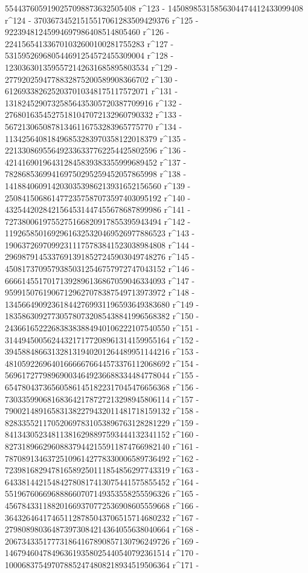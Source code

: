        5544376059190257098873632505408 r^123 - 
       14508985315856304474412433099408 r^124 - 
       37036734521515517061283509429376 r^125 - 
       92239481245994697986408514805460 r^126 - 
       224156541336701032600100281755283 r^127 - 
       531595269680544691254572455309004 r^128 - 
       1230363013595572142631685895803534 r^129 - 
       2779202594778832875200589908366702 r^130 - 
       6126933826252037010348175117572071 r^131 - 
       13182452907325856435305720387709916 r^132 - 
       27680163545275181047072132960790332 r^133 - 
       56721306508781346116753283965775770 r^134 - 
       113425640818496853283970358122018379 r^135 - 
       221330869556492336337762254425802596 r^136 - 
       421416901964312845839383355999689452 r^137 - 
       782868536994169750295259452057865998 r^138 - 
       1418840609142030353986213931652156560 r^139 - 
       2508415068614772357587073597403095192 r^140 - 
       4325442028421564531447455678687899986 r^141 - 
       7273800619755275166820917855395943494 r^142 - 
       11926585016929616325320469526977886523 r^143 - 
       19063726970992311175783841523038984808 r^144 - 
       29698791453376913918527245903049748276 r^145 - 
       45081737095793850312546757972747043152 r^146 - 
       66661455170171392896136867059046334093 r^147 - 
       95991507619067129627078387549713973972 r^148 - 
       134566490923618442769931196593649383680 r^149 - 
       183586309277305780732085438841996568382 r^150 - 
       243661652226838383884940106222107540550 r^151 - 
       314494500562443217177208961314159955164 r^152 - 
       394588486631328131940201264489951144216 r^153 - 
       481059226964016666676644573376112068692 r^154 - 
       569617277989690034649236688334484778044 r^155 - 
       654780437365605861451822317045476656368 r^156 - 
       730335990681683642178727213298945806114 r^157 - 
       790021489165831382279432011481718159132 r^158 - 
       828335521170520697831053896763128281229 r^159 - 
       841343052348113816298897593444132341152 r^160 - 
       827318966296088379442155911874766982140 r^161 - 
       787089134637251096142778330006589736492 r^162 - 
       723981682947816589250111854856297743319 r^163 - 
       643381442154842780817413075441575855452 r^164 - 
       551967606696888660707149353558255596326 r^165 - 
       456784331188201669370772536908605559668 r^166 - 
       364326464174651128785043706515714680232 r^167 - 
       279808980364873973084214364055638040664 r^168 - 
       206734335177731864167890857130796249726 r^169 - 
       146794604784963619358025440540792361514 r^170 - 
       100068375497078852474808218934519506364 r^171 - 
